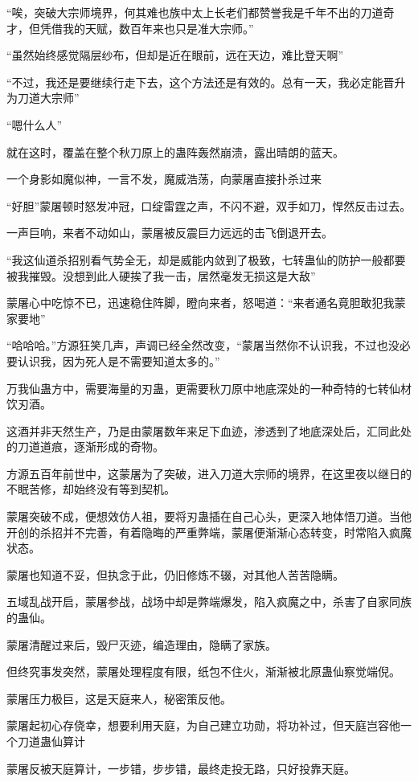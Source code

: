 \begin{this_body}
“唉，突破大宗师境界，何其难也族中太上长老们都赞誉我是千年不出的刀道奇才，但凭借我的天赋，数百年来也只是准大宗师。”

“虽然始终感觉隔层纱布，但却是近在眼前，远在天边，难比登天啊”

“不过，我还是要继续行走下去，这个方法还是有效的。总有一天，我必定能晋升为刀道大宗师”

“嗯什么人”

就在这时，覆盖在整个秋刀原上的蛊阵轰然崩溃，露出晴朗的蓝天。

一个身影如魔似神，一言不发，魔威浩荡，向蒙屠直接扑杀过来

“好胆”蒙屠顿时怒发冲冠，口绽雷霆之声，不闪不避，双手如刀，悍然反击过去。

一声巨响，来者不动如山，蒙屠被反震巨力远远的击飞倒退开去。

“我这仙道杀招别看气势全无，却是威能内敛到了极致，七转蛊仙的防护一般都要被我摧毁。没想到此人硬挨了我一击，居然毫发无损这是大敌”

蒙屠心中吃惊不已，迅速稳住阵脚，瞪向来者，怒喝道：“来者通名竟胆敢犯我蒙家要地”

“哈哈哈。”方源狂笑几声，声调已经全然改变，“蒙屠当然你不认识我，不过也没必要认识我，因为死人是不需要知道太多的。”

万我仙蛊方中，需要海量的刃蛊，更需要秋刀原中地底深处的一种奇特的七转仙材饮刃酒。

这酒并非天然生产，乃是由蒙屠数年来足下血迹，渗透到了地底深处后，汇同此处的刀道道痕，逐渐形成的奇物。

方源五百年前世中，这蒙屠为了突破，进入刀道大宗师的境界，在这里夜以继日的不眠苦修，却始终没有等到契机。

蒙屠突破不成，便想效仿人祖，要将刃蛊插在自己心头，更深入地体悟刀道。当他开创的杀招并不完善，有着隐晦的严重弊端，蒙屠便渐渐心态转变，时常陷入疯魔状态。

蒙屠也知道不妥，但执念于此，仍旧修炼不辍，对其他人苦苦隐瞒。

五域乱战开启，蒙屠参战，战场中却是弊端爆发，陷入疯魔之中，杀害了自家同族的蛊仙。

蒙屠清醒过来后，毁尸灭迹，编造理由，隐瞒了家族。

但终究事发突然，蒙屠处理程度有限，纸包不住火，渐渐被北原蛊仙察觉端倪。

蒙屠压力极巨，这是天庭来人，秘密策反他。

蒙屠起初心存侥幸，想要利用天庭，为自己建立功勋，将功补过，但天庭岂容他一个刀道蛊仙算计

蒙屠反被天庭算计，一步错，步步错，最终走投无路，只好投靠天庭。


\end{this_body}

